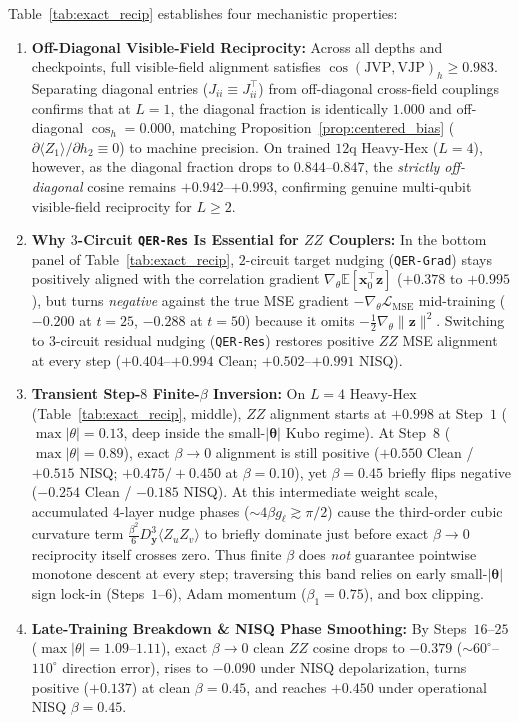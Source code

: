 \documentclass[11pt]{article}
\begin{document}
Table~\ref{tab:exact_recip} establishes four mechanistic properties:
\begin{enumerate}[leftmargin=1.4em,itemsep=2pt,topsep=2pt]
  \item \textbf{Off-Diagonal Visible-Field Reciprocity:} Across all depths and checkpoints, full visible-field alignment satisfies $\cos(\text{JVP},\text{VJP})_h \ge 0.983$. Separating diagonal entries ($J_{ii}\equiv J_{ii}^\top$) from off-diagonal cross-field couplings confirms that at $L{=}1$, the diagonal fraction is identically $1.000$ and off-diagonal $\cos_h{=}0.000$, matching Proposition~\ref{prop:centered_bias} ($\partial\langle Z_1\rangle/\partial h_2\equiv 0$) to machine precision. On trained $12$q Heavy-Hex ($L{=}4$), however, as the diagonal fraction drops to $0.844$--$0.847$, the \emph{strictly off-diagonal} cosine remains $+0.942$--$+0.993$, confirming genuine multi-qubit visible-field reciprocity for $L\ge 2$.
  \item \textbf{Why $3$-Circuit \texttt{QER-Res} Is Essential for $ZZ$ Couplers:} In the bottom panel of Table~\ref{tab:exact_recip}, $2$-circuit target nudging (\texttt{QER-Grad}) stays positively aligned with the correlation gradient $\nabla_\theta\mathbb{E}[\mathbf{x}_0^\top\mathbf{z}]$ ($+0.378$ to $+0.995$), but turns \emph{negative} against the true MSE gradient $-\nabla_\theta\mathcal{L}_{\text{MSE}}$ mid-training ($-0.200$ at $t{=}25$, $-0.288$ at $t{=}50$) because it omits $-\frac{1}{2}\nabla_\theta\|\mathbf{z}\|^2$. Switching to $3$-circuit residual nudging (\texttt{QER-Res}) restores positive $ZZ$ MSE alignment at every step ($+0.404$--$+0.994$ Clean; $+0.502$--$+0.991$ NISQ).
  \item \textbf{Transient Step-$8$ Finite-$\beta$ Inversion:} On $L{=}4$ Heavy-Hex (Table~\ref{tab:exact_recip}, middle), $ZZ$ alignment starts at $+0.998$ at Step~$1$ ($\max|\theta|{=}0.13$, deep inside the small-$|\boldsymbol{\theta}|$ Kubo regime). At Step~$8$ ($\max|\theta|{=}0.89$), exact $\beta{\to}0$ alignment is still positive ($+0.550$ Clean / $+0.515$ NISQ; $+0.475 / +0.450$ at $\beta{=}0.10$), yet $\beta{=}0.45$ briefly flips negative ($-0.254$ Clean / $-0.185$ NISQ). At this intermediate weight scale, accumulated $4$-layer nudge phases ($\sim 4\beta g_\ell \gtrsim \pi/2$) cause the third-order cubic curvature term $\frac{\beta^2}{6} D_{\mathbf{y}}^3\langle Z_u Z_v\rangle$ to briefly dominate just before exact $\beta{\to}0$ reciprocity itself crosses zero. Thus finite $\beta$ does \emph{not} guarantee pointwise monotone descent at every step; traversing this band relies on early small-$|\boldsymbol{\theta}|$ sign lock-in (Steps~$1$--$6$), Adam momentum ($\beta_1{=}0.75$), and box clipping.
  \item \textbf{Late-Training Breakdown \& NISQ Phase Smoothing:} By Steps~$16$--$25$ ($\max|\theta|{=}1.09$--$1.11$), exact $\beta{\to}0$ clean $ZZ$ cosine drops to $-0.379$ ($\sim 60^\circ$--$110^\circ$ direction error), rises to $-0.090$ under NISQ depolarization, turns positive ($+0.137$) at clean $\beta{=}0.45$, and reaches $+0.450$ under operational NISQ $\beta{=}0.45$.
\end{enumerate}
\end{document}
